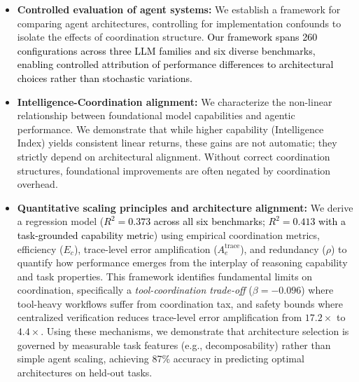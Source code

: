 \begin{itemize}

\item \textbf{Controlled evaluation of agent systems:} We establish a framework for comparing agent architectures, controlling for implementation confounds to isolate the effects of coordination structure. \textcolor{black}{Our framework spans 260 configurations across three LLM families and six diverse benchmarks, enabling controlled attribution of performance differences to architectural choices rather than stochastic variations.}

\item \textbf{Intelligence-Coordination alignment:} We characterize the non-linear relationship between foundational model capabilities and agentic performance. We demonstrate that while higher capability (Intelligence Index) yields consistent linear returns, these gains are not automatic; they strictly depend on architectural alignment. Without correct coordination structures, foundational improvements are often negated by coordination overhead.

\item \textbf{Quantitative scaling principles and architecture alignment:} We derive a regression model (\textcolor{black}{$R^2{=}0.373$ across all six benchmarks; $R^2{=}0.413$ with a task-grounded capability metric}) using empirical coordination metrics, efficiency ($E_c$), trace-level error amplification ($A_e^{\text{trace}}$), and redundancy ($\rho$) to quantify how performance emerges from the interplay of reasoning capability and task properties. This framework identifies fundamental limits on coordination, specifically a \textit{tool-coordination trade-off} ($\beta{=}{-}0.096$) where tool-heavy workflows suffer from coordination tax, and safety bounds where centralized verification reduces trace-level error amplification from $17.2\times$ to $4.4\times$. Using these mechanisms, we demonstrate that architecture selection is governed by measurable task features (e.g., decomposability) rather than simple agent scaling, achieving 87\% accuracy in predicting optimal architectures on held-out tasks.
\end{itemize}

